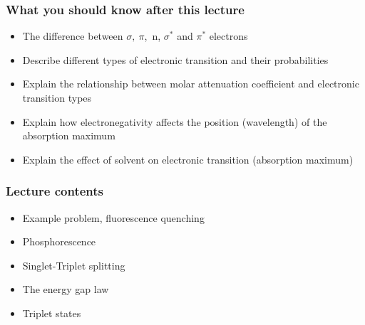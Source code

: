 \documentclass[a4paper,12pt,titlepage]{article}
\begin{document}
\begin{frame}
\frametitle{What you should know after this lecture}
\begin{itemize}
\item The difference between \(\sigma,\  \pi\),\ n, \(\sigma^*\) and \(\pi^*\) electrons
\item Describe different types of electronic transition and their probabilities
\item Explain the relationship between molar attenuation coefficient and electronic transition types
\item Explain how electronegativity affects the position (wavelength) of the absorption maximum
\item Explain the effect of solvent on electronic transition (absorption maximum)
\end{itemize}
\end{frame}

\begin{frame}
	\frametitle{Lecture contents}
		\begin{itemize}
			\item Example problem, fluorescence quenching
			\item Phosphorescence
			\item Singlet-Triplet splitting
			\item The energy gap law
			\item Triplet states
		\end{itemize}
	\end{frame}
\end{document}
